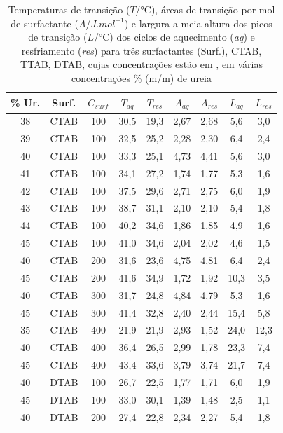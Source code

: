         \begin{table}[H]
            \IBGEtab%
            {\caption{Temperaturas de transição ($T$/°C), áreas de transição por mol de surfactante ($A$/$J.mol^{-1}$) e largura a meia altura dos picos de transição ($L$/°C) dos ciclos de aquecimento (\emph{aq}) e resfriamento (\emph{res}) para três surfactantes (Surf.), CTAB, TTAB, DTAB, cujas concentrações estão em \mM, em várias concentrações \% (m/m) de ureia}
            \label{tab:DSC_temp_areas}}%
            {\begin{tabular}{ccccccccc}
                \toprule
    			\% Ur. & Surf. & $C_{surf}$ &
    			$T_{aq}$ & $T_{res}$ & $A_{aq}$ & $A_{res}$ & $L_{aq}$ & $L_{res}$\\
    			\midrule
    			38 & CTAB & 100 & 30,5 & 19,3 & 2,67 & 2,68 & 5,6 &	3,0\\
    			39 & CTAB & 100 & 32,5 & 25,2 & 2,28 & 2,30 & 6,4 &	2,4\\
    			40 & CTAB & 100 & 33,3 & 25,1 & 4,73 & 4,41 & 5,6 &	3,0\\
    			41 & CTAB & 100 & 34,1 & 27,2 & 1,74 & 1,77 & 5,3 &	1,6\\
    			42 & CTAB & 100 & 37,5 & 29,6 & 2,71 & 2,75 & 6,0 &	1,9\\
    			43 & CTAB & 100 & 38,7 & 31,1 & 2,10 & 2,10 & 5,4 &	1,8\\
    			44 & CTAB & 100 & 40,2 & 34,6 & 1,86 & 1,85 & 4,9 &	1,6\\
    			45 & CTAB & 100 & 41,0 & 34,6 & 2,04 & 2,02 & 4,6 &	1,5\\
    			\midrule
    			40 & CTAB & 200 & 31,6 & 23,6 & 4,75 & 4,81 & 6,4 &	2,4\\
    			45 & CTAB & 200 & 41,6 & 34,9 & 1,72 & 1,92 & 10,3 & 3,5\\
    			40 & CTAB & 300 & 31,7 & 24,8 & 4,84 & 4,79 & 5,3 &	1,6\\
    			45 & CTAB & 300 & 41,4 & 32,8 & 2,40 & 2,44 & 15,4 & 5,8\\
    			35 & CTAB & 400 & 21,9 & 21,9 & 2,93 & 1,52 & 24,0 & 12,3\\
    			40 & CTAB & 400 & 36,4 & 26,5 & 2,99 & 1,78 & 23,3 & 7,4\\
    			45 & CTAB & 400 & 43,4 & 33,6 & 3,79 & 3,74 & 21,7 & 7,4\\
    			\midrule
    			40 & DTAB & 100 & 26,7 & 22,5 & 1,77 & 1,71 & 6,0 & 1,9\\
    			45 & DTAB & 100 & 33,0 & 30,1 & 1,39 & 1,48 & 2,5 & 1,1\\
    			40 & DTAB & 200 & 27,4 & 22,8 & 2,34 & 2,27 & 5,4 &	1,8\\

\end{tabular}}
\end{table}

